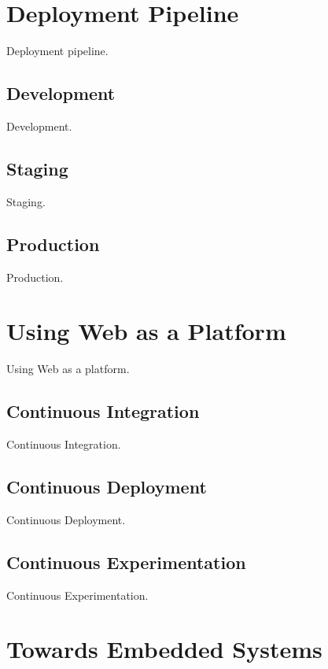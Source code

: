\documentclass[english]{tktltiki2}
\begin{document}

\section{Deployment Pipeline}

Deployment pipeline.

\subsection{Development}

Development.

\subsection{Staging}

Staging.

\subsection{Production}

Production.


\section{Using Web as a Platform}

Using Web as a platform.

\subsection{Continuous Integration}

Continuous Integration.

\subsection{Continuous Deployment}

Continuous Deployment.

\subsection{Continuous Experimentation}

Continuous Experimentation.


\section{Towards Embedded Systems}
\end{document}
